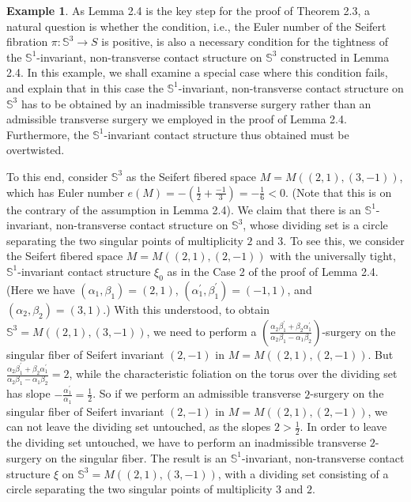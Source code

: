 \documentclass[11pt]{amsart}
\theoremstyle{plain}
\numberwithin{theorem}{section}
\theoremstyle{definition}
\newtheorem{example}[theorem]{Example}
\newcommand{\s}{{\mathbb S}}
\begin{document}
\begin{example}
As Lemma 2.4 is the key step for the proof of Theorem 2.3, a natural question is whether the condition, i.e., the Euler number of the Seifert fibration $\pi: \s^3\rightarrow S$ is positive, is also a necessary 
condition for the tightness of the $\s^1$-invariant, non-transverse contact structure on $\s^3$ 
constructed in Lemma 2.4. In this example, we shall examine a special case where this condition fails, and explain that in this case
the $\s^1$-invariant, non-transverse contact structure on $\s^3$ has to be obtained by an inadmissible 
transverse surgery rather than an admissible transverse surgery we employed in the proof of 
Lemma 2.4. Furthermore, the $\s^1$-invariant contact structure thus obtained must be overtwisted. 

To this end, consider $\s^3$ as the Seifert fibered space $M=M((2,1),(3,-1))$, which has Euler number
$e(M)=-(\frac{1}{2}+\frac{-1}{3})=-\frac{1}{6}<0$. (Note that this is on the contrary of the assumption in Lemma 2.4). We claim that there is an $\s^1$-invariant, non-transverse contact structure on $\s^3$,
whose dividing set is a circle separating the two singular points of multiplicity $2$ and $3$. To see this,
we consider the Seifert fibered space $M=M((2,1), (2,-1))$ with the universally tight, $\s^1$-invariant
contact structure $\xi_0$ as in the Case 2 of the proof of Lemma 2.4. (Here we have 
$(\alpha_1,\beta_1)=(2,1)$, $(\alpha_1^\prime,\beta_1^\prime)=(-1,1)$, and $(\alpha_2,\beta_2)=
(3,1)$.) With this understood, to obtain $\s^3=M((2,1),(3,-1))$, we need to perform a
$(\frac{\alpha_2\beta_1^\prime+\beta_2\alpha_1^\prime}{\alpha_2\beta_1-\alpha_1\beta_2})$-surgery 
on the singular fiber of Seifert invariant $(2,-1)$ in $M=M((2,1), (2,-1))$. But 
$\frac{\alpha_2\beta_1^\prime+\beta_2\alpha_1^\prime}{\alpha_2\beta_1-\alpha_1\beta_2}=2$, 
while the characteristic foliation on the torus over the dividing set has slope $-\frac{\alpha_1^\prime}{\alpha_1}=\frac{1}{2}$. So if we perform an admissible transverse $2$-surgery on the singular fiber
of Seifert invariant $(2,-1)$ in $M=M((2,1), (2,-1))$, we can not leave the dividing set untouched, 
as the slopes $2>\frac{1}{2}$. In order to leave the dividing set untouched, we have to perform an
inadmissible transverse $2$-surgery on the singular fiber. The result is an $\s^1$-invariant, non-transverse contact structure $\xi$ on $\s^3=M((2,1),(3,-1))$, with a dividing set consisting of a circle 
separating the two singular points of multiplicity $3$ and $2$. 


\end{example}
\end{document}
